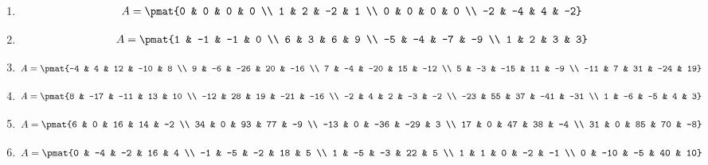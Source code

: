 \begin{enumerate}
\item

\begin{align*}
A = \pmat{0 & 0 & 0 & 0 \\ 1 & 2 & -2 & 1 \\ 0 & 0 & 0 & 0 \\ -2 & -4 & 4 & -2}
\end{align*}

\item

\begin{align*}
A = \pmat{1 & -1 & -1 & 0 \\ 6 & 3 & 6 & 9 \\ -5 & -4 & -7 & -9 \\ 1 & 2 & 3 & 3}
\end{align*}

\item

\begin{align*}
A = \pmat{-4 & 4 & 12 & -10 & 8 \\ 9 & -6 & -26 & 20 & -16 \\ 7 & -4 & -20 & 15 & -12 \\ 5 & -3 & -15 & 11 & -9 \\ -11 & 7 & 31 & -24 & 19}
\end{align*}

\item

\begin{align*}
A = \pmat{8 & -17 & -11 & 13 & 10 \\ -12 & 28 & 19 & -21 & -16 \\ -2 & 4 & 2 & -3 & -2 \\ -23 & 55 & 37 & -41 & -31 \\ 1 & -6 & -5 & 4 & 3}
\end{align*}

\item

\begin{align*}
A = \pmat{6 & 0 & 16 & 14 & -2 \\ 34 & 0 & 93 & 77 & -9 \\ -13 & 0 & -36 & -29 & 3 \\ 17 & 0 & 47 & 38 & -4 \\ 31 & 0 & 85 & 70 & -8}
\end{align*}

\item

\begin{align*}
A = \pmat{0 & -4 & -2 & 16 & 4 \\ -1 & -5 & -2 & 18 & 5 \\ 1 & -5 & -3 & 22 & 5 \\ 1 & 1 & 0 & -2 & -1 \\ 0 & -10 & -5 & 40 & 10}
\end{align*}


\end{enumerate}
